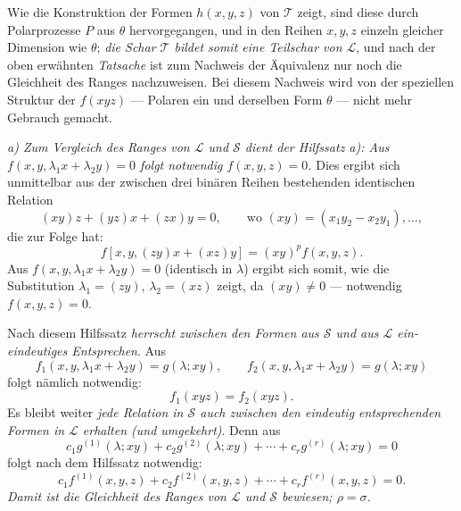 Wie die Konstruktion der Formen $h(x,y,z)$ von $\mathcal T$ zeigt, sind diese durch Polarprozesse $P$ aus $\theta$ hervorgegangen, und in den Reihen $x,y,z$ einzeln gleicher Dimension wie $\theta$; \emph{die Schar $\mathcal T$ bildet somit eine Teilschar von $\mathcal L$}, und nach der oben erwähnten \emph{Tatsache} ist zum Nachweis der Äquivalenz nur noch die Gleichheit des Ranges nachzuweisen. Bei diesem Nachweis wird von der speziellen Struktur der $f(xyz)$ --- Polaren ein und derselben Form $\theta$ --- nicht mehr Gebrauch gemacht.

\emph{a) Zum Vergleich des Ranges von $\mathcal L$ und $\mathcal S$ dient der Hilfssatz a): Aus $f(x,y,\lambda_1x+\lambda_2y)=0$ folgt notwendig $f(x,y,z)=0$.} Dies ergibt sich unmittelbar aus der zwischen drei binären Reihen bestehenden identischen Relation
\[
  (xy)z+(yz)x+(zx)y=0,
  \qquad \text{wo }(xy)=(x_1y_2-x_2y_1),\ldots,
\]
die zur Folge hat:
\[
  f[x,y,(zy)x+(xz)y]=(xy)^p f(x,y,z).
\]
Aus $f(x,y,\lambda_1x+\lambda_2y)=0$ (identisch in $\lambda$) ergibt sich somit, wie die Substitution $\lambda_1=(zy)$, $\lambda_2=(xz)$ zeigt, da $(xy)\ne0$ --- notwendig $f(x,y,z)=0$.

Nach diesem Hilfssatz \emph{herrscht zwischen den Formen aus $\mathcal S$ und aus $\mathcal L$ ein-eindeutiges Entsprechen}. Aus
\[
  f_1(x,y,\lambda_1x+\lambda_2y)=g(\lambda;xy),\qquad
  f_2(x,y,\lambda_1x+\lambda_2y)=g(\lambda;xy)
\]
folgt nämlich notwendig:
\[
  f_1(xyz)=f_2(xyz).
\]
Es bleibt weiter \emph{jede Relation in $\mathcal S$ auch zwischen den eindeutig entsprechenden Formen in $\mathcal L$ erhalten (und umgekehrt)}. Denn aus
\[
  c_1g^{(1)}(\lambda;xy)+c_2g^{(2)}(\lambda;xy)+\cdots+c_rg^{(r)}(\lambda;xy)=0
\]
folgt nach dem Hilfssatz notwendig:
\[
  c_1f^{(1)}(x,y,z)+c_2f^{(2)}(x,y,z)+\cdots+c_rf^{(r)}(x,y,z)=0.
\]
\emph{Damit ist die Gleichheit des Ranges von $\mathcal L$ und $\mathcal S$ bewiesen; $\rho=\sigma$.}

